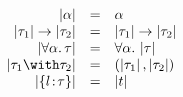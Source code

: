 
\[
\begin{array}{rcl}
  \image \alpha                     & = & \alpha \\
  \image {\ty_1} \to \image {\ty_2} & = & \image {\ty_1} \to \image {\ty_2} \\
  \image {\Forall \alpha \ty}      & = & \Forall \alpha \image \ty \\
  \image {\ty_1 \Intersect \ty_2}   & = & \Pair {\image {\ty_1}} {\image {\ty_2}} \\
  \image {\RecTy l \ty}            & = & \image t
\end{array}
\]